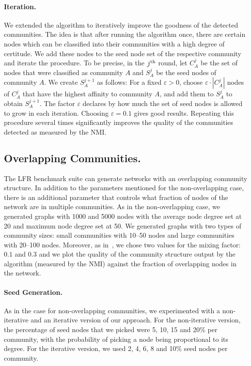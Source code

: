 \paragraph{Iteration.}
We extended the algorithm to iteratively improve the goodness of the detected communities.
The idea is that after running the algorithm once, there are certain nodes which can be classified 
into their communities with a high degree of certitude. We add these nodes to the seed node 
set of the respective community and iterate the procedure. To be precise, in the $j^{\textrm{th}}$ round, 
let $C^j_A$ be the set of nodes that were classified as community $A$ and $S^j_A$ 
be the seed nodes of community $A$. We create $S^{j+1}_A$ as follows: For a fixed $\varepsilon > 0$, 
choose $\varepsilon \cdot |C^j_A|$ nodes of $C^j_A$ that have the highest affinity to community $A$, 
and add them to $S^j_A$ to obtain $S^{j + 1}_A$. 
The factor $\varepsilon$ declares by how much the set of seed nodes is allowed to grow in each iteration. 
Choosing $\varepsilon = 0.1$ gives good results. Repeating this procedure several times significantly 
improves the quality of the communities detected as measured by the NMI.

\subsection{Overlapping Communities.}
The LFR benchmark suite can generate networks with an overlapping community structure. 
In addition to the parameters mentioned for the non-overlapping case, there is an additional 
parameter that controls what fraction of nodes of the network are in multiple communities. 
As in the non-overlapping case, we generated graphs with 1000 and 5000 nodes with the average
node degree set at 20 and maximum node degree set at 50. We generated graphs with two types 
of community sizes: small communities with 10--50 nodes and large communities with 20--100 nodes.
Moreover, as in~\cite{LF09}, we chose two values for the mixing factor: $0.1$ and $0.3$ 
and we plot the quality of the community structure output by the algorithm 
(measured by the NMI) against the fraction of overlapping nodes in the network.


\paragraph{Seed Generation.}
As in the case for non-overlapping communities, we experimented with a non-iterative 
and an iterative version of our approach. For the non-iterative version, the percentage 
of seed nodes that we picked were 5, 10, 15 and 20$\%$ per community, with the probability
of picking a node being proportional to its degree. For the iterative version, we used 
2, 4, 6, 8 and 10$\%$ seed nodes per community. 

